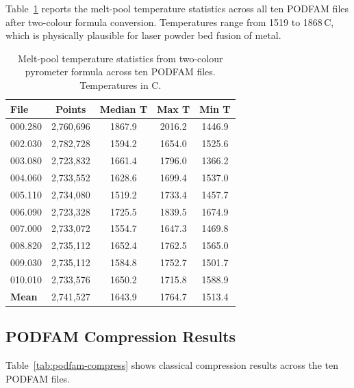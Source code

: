Table~\ref{tab:podfam-temps} reports the melt-pool temperature statistics across
all ten PODFAM files after two-colour formula conversion. Temperatures range from
1519 to 1868\,\textdegree C, which is physically plausible for laser powder
bed fusion of metal.

\begin{table}[H]
\centering
\caption{Melt-pool temperature statistics from two-colour pyrometer formula
         across ten PODFAM files. Temperatures in \textdegree C.}
\label{tab:podfam-temps}
\begin{tabular}{lcccc}
\toprule
\textbf{File} & \textbf{Points} & \textbf{Median T}
& \textbf{Max T} & \textbf{Min T} \\
\midrule
000.280 & 2,760,696 & 1867.9 & 2016.2 & 1446.9 \\
002.030 & 2,782,728 & 1594.2 & 1654.0 & 1525.6 \\
003.080 & 2,723,832 & 1661.4 & 1796.0 & 1366.2 \\
004.060 & 2,733,552 & 1628.6 & 1699.4 & 1537.0 \\
005.110 & 2,734,080 & 1519.2 & 1733.4 & 1457.7 \\
006.090 & 2,723,328 & 1725.5 & 1839.5 & 1674.9 \\
007.000 & 2,733,072 & 1554.7 & 1647.3 & 1469.8 \\
008.820 & 2,735,112 & 1652.4 & 1762.5 & 1565.0 \\
009.030 & 2,735,112 & 1584.8 & 1752.7 & 1501.7 \\
010.010 & 2,733,576 & 1650.2 & 1715.8 & 1588.9 \\
\midrule
\textbf{Mean} & 2,741,527 & 1643.9 & 1764.7 & 1513.4 \\
\bottomrule
\end{tabular}
\end{table}

\subsection{PODFAM Compression Results}

Table~\ref{tab:podfam-compress} shows classical compression results across the
ten PODFAM files.

